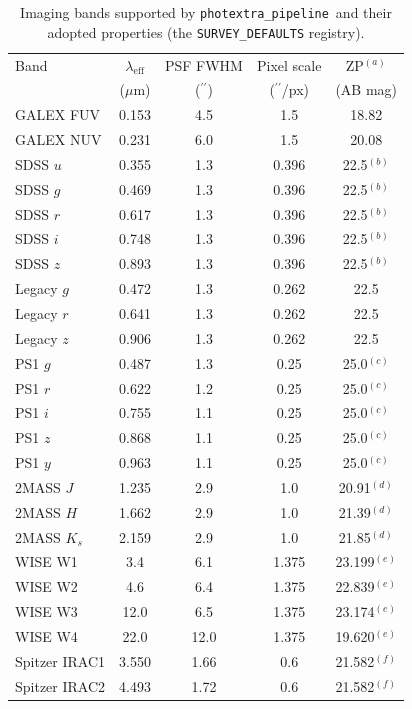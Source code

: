 \documentclass{aa}
\newcommand{\photextra}{\texttt{photextra\_pipeline}}
\newcommand{\arcsecond}{\ensuremath{^{\prime\prime}}}
\begin{document}
\begin{table}
\caption{Imaging bands supported by \photextra\ and their adopted
properties (the \texttt{SURVEY\_DEFAULTS} registry).}
\label{tab:surveys}
\centering
\begin{tabular}{lcccc}
\hline\hline
Band & $\lambda_\mathrm{eff}$ & PSF FWHM & Pixel scale & ZP$^{(a)}$ \\
     & ($\mu$m) & (\arcsecond) & (\arcsecond/px) & (AB mag) \\
\hline
GALEX FUV & 0.153 & 4.5  & 1.5   & 18.82 \\
GALEX NUV & 0.231 & 6.0  & 1.5   & 20.08 \\
SDSS $u$  & 0.355 & 1.3  & 0.396 & 22.5$^{(b)}$ \\
SDSS $g$  & 0.469 & 1.3  & 0.396 & 22.5$^{(b)}$ \\
SDSS $r$  & 0.617 & 1.3  & 0.396 & 22.5$^{(b)}$ \\
SDSS $i$  & 0.748 & 1.3  & 0.396 & 22.5$^{(b)}$ \\
SDSS $z$  & 0.893 & 1.3  & 0.396 & 22.5$^{(b)}$ \\
Legacy $g$ & 0.472 & 1.3 & 0.262 & 22.5  \\
Legacy $r$ & 0.641 & 1.3 & 0.262 & 22.5  \\
Legacy $z$ & 0.906 & 1.3 & 0.262 & 22.5  \\
PS1 $g$   & 0.487 & 1.3  & 0.25  & 25.0$^{(c)}$ \\
PS1 $r$   & 0.622 & 1.2  & 0.25  & 25.0$^{(c)}$ \\
PS1 $i$   & 0.755 & 1.1  & 0.25  & 25.0$^{(c)}$ \\
PS1 $z$   & 0.868 & 1.1  & 0.25  & 25.0$^{(c)}$ \\
PS1 $y$   & 0.963 & 1.1  & 0.25  & 25.0$^{(c)}$ \\
2MASS $J$   & 1.235 & 2.9 & 1.0  & 20.91$^{(d)}$ \\
2MASS $H$   & 1.662 & 2.9 & 1.0  & 21.39$^{(d)}$ \\
2MASS $K_s$ & 2.159 & 2.9 & 1.0  & 21.85$^{(d)}$ \\
WISE W1   & 3.4   & 6.1  & 1.375 & 23.199$^{(e)}$ \\
WISE W2   & 4.6   & 6.4  & 1.375 & 22.839$^{(e)}$ \\
WISE W3   & 12.0  & 6.5  & 1.375 & 23.174$^{(e)}$ \\
WISE W4   & 22.0  & 12.0 & 1.375 & 19.620$^{(e)}$ \\
Spitzer IRAC1 & 3.550 & 1.66 & 0.6 & 21.582$^{(f)}$ \\
Spitzer IRAC2 & 4.493 & 1.72 & 0.6 & 21.582$^{(f)}$ \\

\end{tabular}
\end{table}
\end{document}
